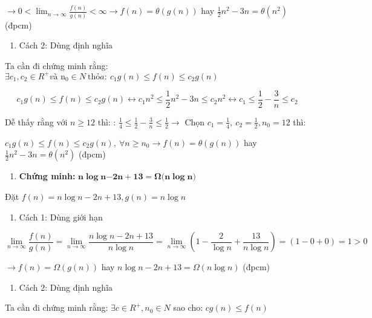 \documentclass[
]{article}
\begin{document}
\(\rightarrow 0 < \lim_{n \rightarrow \infty}\frac{f(n)}{g(n)} < \infty \rightarrow f(n) = \theta(g(n))\)
hay \(\frac{1}{2}n^{2} - 3n = \theta(n^{2})\) (đpcm)

\begin{enumerate}
\item
  Cách 2: Dùng định nghĩa
\end{enumerate}

Ta cần đi chứng minh rằng:
\(\exists c_{1},c_{2} \in R^{+}và\text{\ n}_{0} \in N\ \text{th}ỏa:\ c_{1}g(n) \leq f(n) \leq c_{2}g(n)\)

\[c_{1}g(n) \leq f(n) \leq c_{2}g(n) \leftrightarrow c_{1}n^{2} \leq \frac{1}{2}n^{2} - 3n \leq c_{2}n^{2} \leftrightarrow c_{1} \leq \frac{1}{2} - \frac{3}{n} \leq c_{2}\]

Dễ thấy rằng với \(n \geq 12\) thì: :
\(\frac{1}{4} \leq \frac{1}{2} - \frac{3}{n} \leq \frac{1}{2} \rightarrow\)
Chọn \(c_{1} = \frac{1}{4},\ c_{2} = \frac{1}{2},n_{0} = 12\) thì:

\(c_{1}g(n) \leq f(n) \leq c_{2}g(n),\ \forall n \geq n_{0} \rightarrow f(n) = \theta(g(n))\)
hay \(\frac{1}{2}n^{2} - 3n = \theta(n^{2})\) (đpcm)

\begin{enumerate}
\item
  \textbf{Chứng minh:}
  \(\mathbf{n}\mathbf{\log}\mathbf{n}\mathbf{- 2}\mathbf{n + 13 = \Omega(n}\mathbf{\log}\mathbf{n}\mathbf{)}\)
\end{enumerate}

Đặt \(f(n) = n\log n - 2n + 13,g(n) = n\log n\)

\begin{enumerate}
\item
  Cách 1: Dùng giới hạn
\end{enumerate}

\[\lim_{n \rightarrow \infty}\frac{f(n)}{g(n)} = \lim_{n \rightarrow \infty}\frac{n\log n - 2n + 13}{n\log n} = \lim_{n \rightarrow \infty}(1 - \frac{2}{\log n} + \frac{13}{n\log n}) = (1 - 0 + 0) = 1 > 0\]

\(\rightarrow f(n) = \Omega(g(n))\) hay
\(n\log n - 2n + 13 = \Omega(n\log n)\) (đpcm)

\begin{enumerate}
\item
  Cách 2: Dùng định nghĩa
\end{enumerate}

Ta cần đi chứng minh rằng: \(\exists c \in R^{+},n_{0} \in N\) sao cho:
\(cg(n) \leq f(n)\)
\end{document}
